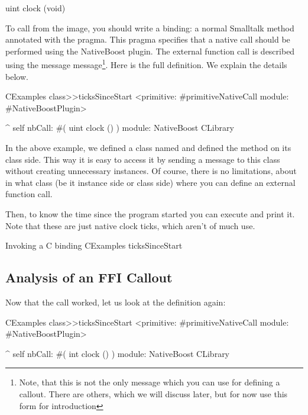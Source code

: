 \documentclass[a4paper,10pt,twoside]{book}
\begin{document}
\begin{code}{}
uint clock (void)
\end{code}

To call  from the image, you should write a binding: a normal Smalltalk method annotated with the  pragma. This pragma specifies that a native call should be performed using the NativeBoost plugin.  The external function call is described using the message  message\footnote{Note, that this is not the only message which you can use for defining a callout. There are others, which we will discuss later, but for now use this form for introduction}. Here is the full definition. We  explain the details below.

\begin{code}{}
CExamples class>>ticksSinceStart
	<primitive: #primitiveNativeCall module: #NativeBoostPlugin>
	
	^ self nbCall: #( uint clock () ) module: NativeBoost CLibrary
\end{code}

In the above example, we defined a class named  and defined the method on its class side. This way it is easy to access it by sending a message to this class without creating unnecessary instances. Of course, there is no limitations, about in what class (be it instance side or class side) where you can define an external function call.

Then, to know the time since the program started you can execute and print it.
Note that these are just native clock ticks, which aren't of much use. 
\begin{script}{Invoking a C binding}
CExamples ticksSinceStart
\end{script}


\subsection{Analysis of an FFI Callout}
Now that the call worked, let us look at the definition again:

\begin{code}{}
CExamples class>>ticksSinceStart
	<primitive: #primitiveNativeCall module: #NativeBoostPlugin>
	
	^ self nbCall: #( int clock () ) module: NativeBoost CLibrary
\end{code}
\end{document}
